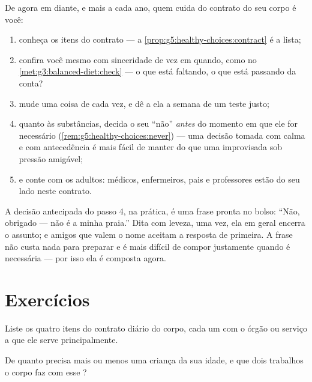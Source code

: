 \begin{method}\label{met:g5:healthy-choices:run}
De agora em diante, e mais a cada ano, quem cuida do contrato do seu
corpo é você:
\begin{enumerate}
  \item conheça os itens do contrato --- a
        \cref{prop:g5:healthy-choices:contract} é a lista;
  \item confira você mesmo com sinceridade de vez em quando, como no
        \cref{met:g3:balanced-diet:check} --- o que está faltando, o
        que está passando da conta?
  \item mude uma coisa de cada vez, e dê a ela a semana de um teste
        justo;
  \item quanto às substâncias, decida o seu ``não'' \emph{antes} do
        momento em que ele for necessário
        (\cref{rem:g5:healthy-choices:never}) --- uma decisão tomada
        com calma e com antecedência é mais fácil de manter do que
        uma improvisada sob pressão amigável;
  \item e conte com os adultos: médicos, enfermeiros, pais e
        professores estão do seu lado neste contrato.
\end{enumerate}
\end{method}

\begin{example}\label{ex:g5:healthy-choices:answers}
A decisão antecipada do passo 4, na prática, é uma frase pronta no
bolso: ``Não, obrigado --- não é a minha praia.'' Dita com leveza,
uma vez, ela em geral encerra o assunto; e amigos que valem o nome
aceitam a resposta de primeira. A frase não custa nada para
preparar e é mais difícil de compor justamente quando é necessária
--- por isso ela é composta agora.
\end{example}

\section{Exercícios}

\begin{exercise}[$\star$]\label{exo:g5:healthy-choices:1}
Liste os quatro itens do contrato diário do corpo, cada um com o
órgão ou serviço a que ele serve principalmente.
\end{exercise}

\begin{exercise}[$\star$]\label{exo:g5:healthy-choices:2}
De quanto  precisa mais ou menos uma criança da sua idade, e que
dois trabalhos o corpo faz com esse ?
\end{exercise}

